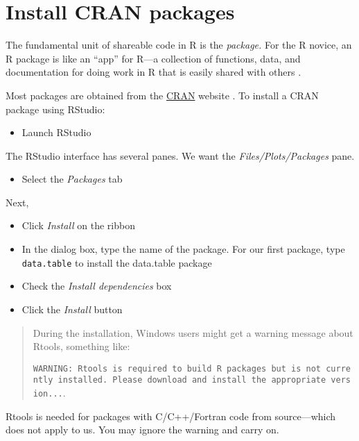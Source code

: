\documentclass[
]{book}
\providecommand{\tightlist}{%
  \setlength{\itemsep}{0pt}\setlength{\parskip}{0pt}}
\begin{document}
\hypertarget{install-cran-packages}{%
\section{Install CRAN packages}\label{install-cran-packages}}

The fundamental unit of shareable code in R is the \emph{package.} For the R novice, an R package is like an ``app'' for R---a collection of functions, data, and documentation for doing work in R that is easily shared with others \citep{wickham2014advanced}.

Most packages are obtained from the \href{https://cran.r-project.org/}{CRAN} website \citep{cranweb}. To install a CRAN package using RStudio:

\begin{itemize}
\tightlist
\item
  Launch RStudio
\end{itemize}

The RStudio interface has several panes. We want the \emph{Files/Plots/Packages} pane.

\begin{itemize}
\tightlist
\item
  Select the \emph{Packages} tab
\end{itemize}

Next,

\begin{itemize}
\tightlist
\item
  Click \emph{Install} on the ribbon
\item
  In the dialog box, type the name of the package. For our first package, type \texttt{data.table} to install the data.table package \citep{R-data.table}
\item
  Check the \emph{Install dependencies} box
\item
  Click the \emph{Install} button
\end{itemize}

\begin{quote}
During the installation, Windows users might get a warning message about
Rtools, something like:

\texttt{WARNING:\ Rtools\ is\ required\ to\ build\ R\ packages\ but\ is\ not\ currently\ installed.\ Please\ download\ and\ install\ the\ appropriate\ version...}.
\end{quote}

Rtools is needed for packages with C/C++/Fortran code from source---which does not apply to us. You may ignore the warning and carry on.
\end{document}
